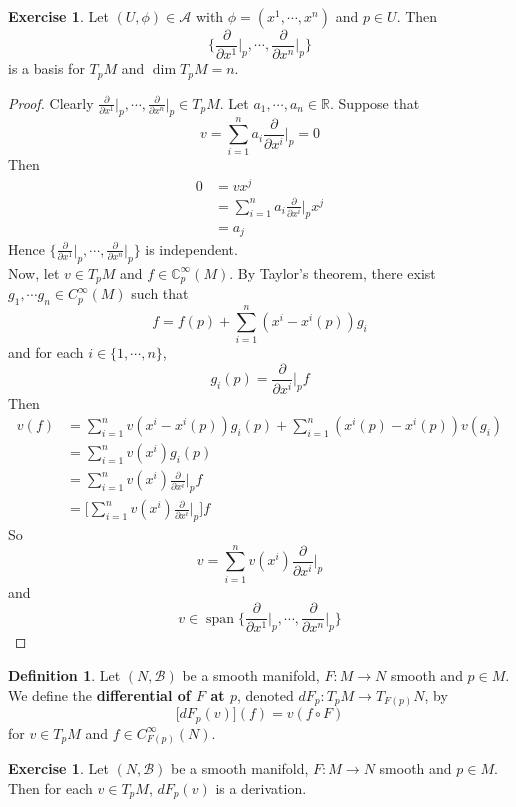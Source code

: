 \documentclass{book}
\theoremstyle{definition}
\newtheorem{defn}[definition]{Definition}
\newtheorem{ex}[definition]{Exercise}
\newcommand{\C}{\mathbb{C}}
\newcommand{\R}{\mathbb{R}}
\newcommand{\MA}{\mathcal{A}}
\newcommand{\MB}{\mathcal{B}}
\DeclareMathOperator{\spn}{span}
\DeclareMathOperator*{\0}{\mbf{0}}
\DeclareMathOperator*{\1}{\mbf{1}}
\newcommand{\tbf}[1]{\textbf{#1}}
\newcommand{\p}{\partial}
\begin{document}
	\begin{ex}
		Let $(U, \phi) \in \MA$ with $\phi = (x^1, \cdots, x^n)$ and $p \in U$. Then $$ \bigg \{\frac{\p}{\p x^1} \bigg|_p, \cdots, \frac{\p}{\p x^n} \bigg|_p \bigg \}$$ is a basis for $T_pM$ and $\dim T_pM = n$.
	\end{ex}

	\begin{proof}
		Clearly $\frac{\p}{\p x^1} \bigg|_p, \cdots, \frac{\p}{\p x^n} \bigg|_p \in T_pM$. Let $a_1, \cdots, a_n \in \R$. Suppose that $$v = \sum_{i=1}^n a_i \frac{\p}{\p x^i} \bigg |_p  = 0$$
		Then 
		\begin{align*}
			0
			&= v x^j \\
			&= \sum_{i=1}^n a_i \frac{\p}{\p x^i} \bigg |_p  x^j \\
			&= a_j
		\end{align*}
		Hence $\bigg \{\frac{\p}{\p x^1} \bigg|_p, \cdots, \frac{\p}{\p x^n} \bigg|_p \bigg \}$ is independent.\\
		Now, let $v \in T_pM$ and $f \in \C^{\infty}_p(M)$. By Taylor's theorem, there exist $g_1, \cdots g_n \in C_p^{\infty}(M)$ such that $$f = f(p) + \sum_{i=1}^n(x^i - x^i(p)) g_i$$ and for each $i \in \{1, \cdots, n\}$, $$g_i(p) = \frac{\p}{\p x^i} \bigg |_p  f $$ Then 
		\begin{align*}
			v(f)
			&= \sum_{i=1}^nv(x^i - x^i(p)) g_i(p) + \sum_{i=1}^n(x^i(p) - x^i(p)) v(g_i) \\
			&= \sum_{i=1}^nv(x^i)g_i(p) \\
			&= \sum_{i=1}^nv(x^i)\frac{\p}{\p x^i} \bigg |_p  f \\
			&= \bigg[ \sum_{i=1}^nv(x^i)\frac{\p}{\p x^i} \bigg |_p  \bigg] f
		\end{align*}
		So $$v = \sum_{i=1}^nv(x^i)\frac{\p}{\p x^i} \bigg |_p  $$ and $$v \in \spn \bigg \{\frac{\p}{\p x^1} \bigg|_p, \cdots, \frac{\p}{\p x^n} \bigg|_p \bigg \}$$
	\end{proof}



	\begin{defn}
		Let $(N, \MB)$ be a smooth manifold, $F: M \rightarrow N$ smooth and $p \in M$. We define the \tbf{differential of $F$ at $p$}, denoted $dF_p: T_pM \rightarrow T_{F(p)}N$, by $$\bigg[ dF_p(v) \bigg] (f) = v (f \circ F)$$  for $v \in T_pM$ and $f \in C^{\infty}_{F(p)}(N)$.
	\end{defn}
	
	
	
	\begin{ex}
	Let $(N, \MB)$ be a smooth manifold, $F: M \rightarrow N$ smooth and $p \in M$. Then for each $v \in T_pM$, $dF_p(v)$ is a derivation.
	\end{ex}
	
\end{document}
